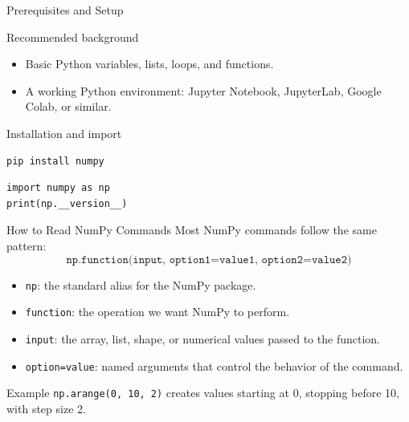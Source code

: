 \documentclass[aspectratio=169,11pt]{beamer}
\begin{document}
\begin{frame}[fragile]{Prerequisites and Setup}
\begin{block}{Recommended background}
\begin{itemize}
  \item Basic Python variables, lists, loops, and functions.
  \item A working Python environment: Jupyter Notebook, JupyterLab, Google Colab, or similar.
\end{itemize}
\end{block}
\begin{block}{Installation and import}
\begin{lstlisting}[style=py]
pip install numpy
\end{lstlisting}
\begin{lstlisting}[style=py]
import numpy as np
print(np.__version__)
\end{lstlisting}
\end{block}
\end{frame}


\begin{frame}{How to Read NumPy Commands}
\small
Most NumPy commands follow the same pattern:
\[
\texttt{np.function(input, option1=value1, option2=value2)}
\]
\begin{itemize}
  \item \texttt{np}: the standard alias for the NumPy package.
  \item \texttt{function}: the operation we want NumPy to perform.
  \item \texttt{input}: the array, list, shape, or numerical values passed to the function.
  \item \texttt{option=value}: named arguments that control the behavior of the command.
\end{itemize}
\begin{block}{Example}
\texttt{np.arange(0, 10, 2)} creates values starting at 0, stopping before 10, with step size 2.
\end{block}
\end{frame}
\end{document}

